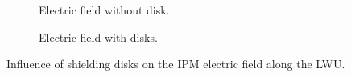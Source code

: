 \begin{figure}[!ht]
	\centering
	\begin{subfigure}{0.7\textwidth}
		
		\caption[Electric field without disk]{Electric field without disk.}
		\label{chap3:no_disk}
	\end{subfigure}

	\begin{subfigure}{0.7\textwidth}
		\centering
		
		\caption[Electric field with disks]{Electric field with disks.}
		\label{chap3:disks}
	\end{subfigure}
	\caption[Influence of shielding disks on the IPM electric field]{Influence of shielding disks on the IPM electric field along the LWU.}
	\label{chap3:IPM_disk}
\end{figure}
